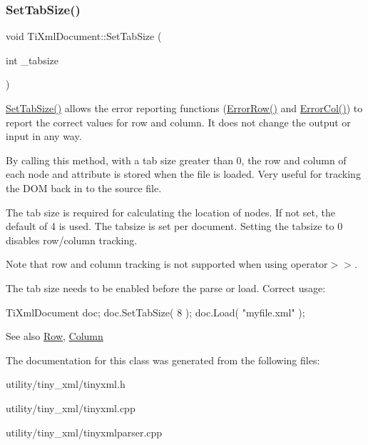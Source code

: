 \subsubsection{\texorpdfstring{Set\+Tab\+Size()}{SetTabSize()}}
{\footnotesize\ttfamily void Ti\+Xml\+Document\+::\+Set\+Tab\+Size (\begin{DoxyParamCaption}\item[{int}]{\+\_\+tabsize }\end{DoxyParamCaption})\hspace{0.3cm}{\ttfamily [inline]}}

\hyperlink{class_ti_xml_document_a51dac56316f89b35bdb7d0d433ba988e}{Set\+Tab\+Size()} allows the error reporting functions (\hyperlink{class_ti_xml_document_a062e5257128a7da31b0b2e38cd524600}{Error\+Row()} and \hyperlink{class_ti_xml_document_adea69de889449a2587afb8ee043f43f5}{Error\+Col()}) to report the correct values for row and column. It does not change the output or input in any way.

By calling this method, with a tab size greater than 0, the row and column of each node and attribute is stored when the file is loaded. Very useful for tracking the D\+OM back in to the source file.

The tab size is required for calculating the location of nodes. If not set, the default of 4 is used. The tabsize is set per document. Setting the tabsize to 0 disables row/column tracking.

Note that row and column tracking is not supported when using operator$>$$>$.

The tab size needs to be enabled before the parse or load. Correct usage\+: \begin{DoxyVerb}TiXmlDocument doc;
doc.SetTabSize( 8 );
doc.Load( "myfile.xml" );
\end{DoxyVerb}


\begin{DoxySeeAlso}{See also}
\hyperlink{class_ti_xml_base_ad0cacca5d76d156b26511f46080b442e}{Row}, \hyperlink{class_ti_xml_base_ad283b95d9858d5d78c334f4a61b07bb4}{Column} 
\end{DoxySeeAlso}


The documentation for this class was generated from the following files\+:\begin{DoxyCompactItemize}
\item 
utility/tiny\+\_\+xml/tinyxml.\+h\item 
utility/tiny\+\_\+xml/tinyxml.\+cpp\item 
utility/tiny\+\_\+xml/tinyxmlparser.\+cpp\end{DoxyCompactItemize}
